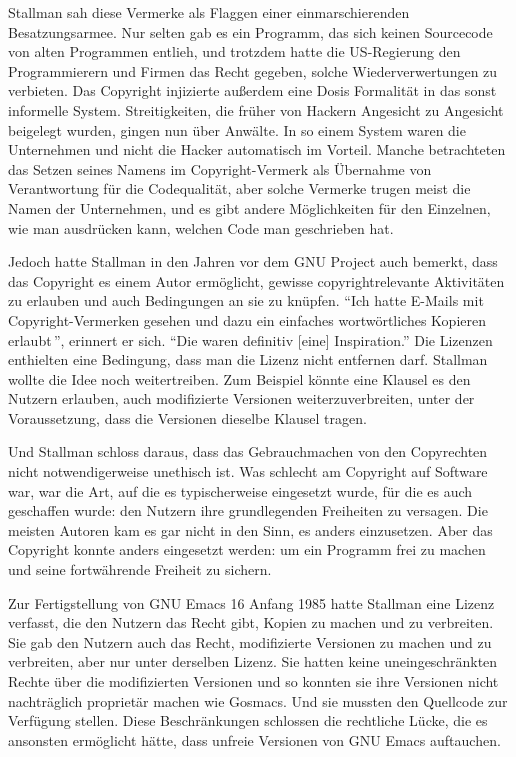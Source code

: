 Stallman sah diese Vermerke als Flaggen einer einmarschierenden Besatzungsarmee. Nur selten gab es ein Programm, das sich keinen Sourcecode von alten Programmen entlieh, und trotzdem hatte die US-Regierung den Programmierern und Firmen das Recht gegeben, solche Wiederverwertungen zu verbieten. Das Copyright injizierte außerdem eine Dosis Formalität in das sonst informelle System. Streitigkeiten, die früher von Hackern Angesicht zu Angesicht beigelegt wurden, gingen nun über Anwälte. In so einem System waren die Unternehmen und nicht die Hacker automatisch im Vorteil. Manche betrachteten das Setzen seines Namens im Copyright-Vermerk als Übernahme von Verantwortung für die Codequalität, aber solche Vermerke trugen meist die Namen der Unternehmen, und es gibt andere Möglichkeiten für den Einzelnen, wie man ausdrücken kann, welchen Code man geschrieben hat.

Jedoch hatte Stallman in den Jahren vor dem GNU Project auch bemerkt, dass das Copyright es einem Autor ermöglicht, gewisse copyrightrelevante Aktivitäten zu erlauben und auch Bedingungen an sie zu knüpfen. "`Ich hatte E-Mails mit Copyright-Vermerken gesehen und dazu ein einfaches \glq wortwörtliches Kopieren erlaubt\grq\,"', erinnert er sich. "`Die waren definitiv [eine] Inspiration."' Die Lizenzen enthielten eine Bedingung, dass man die Lizenz nicht entfernen darf. Stallman wollte die Idee noch weitertreiben. Zum Beispiel könnte eine Klausel es den Nutzern erlauben, auch modifizierte Versionen weiterzuverbreiten, unter der Voraussetzung, dass die Versionen dieselbe Klausel tragen.

Und Stallman schloss daraus, dass das Gebrauchmachen von den Copyrechten nicht notwendigerweise unethisch ist. Was schlecht am Copyright auf Software war, war die Art, auf die es typischerweise eingesetzt wurde, für die es auch geschaffen wurde: den Nutzern ihre grundlegenden Freiheiten zu versagen. Die meisten Autoren kam es gar nicht in den Sinn, es anders einzusetzen. Aber das Copyright konnte anders eingesetzt werden: um ein Programm frei zu machen und seine fortwährende Freiheit zu sichern.

Zur Fertigstellung von GNU Emacs 16 Anfang 1985 hatte Stallman eine Lizenz verfasst, die den Nutzern das Recht gibt, Kopien zu machen und zu verbreiten. Sie gab den Nutzern auch das Recht, modifizierte Versionen zu machen und zu verbreiten, aber nur unter derselben Lizenz. Sie hatten keine uneingeschränkten Rechte über die modifizierten Versionen und so konnten sie ihre Versionen nicht nachträglich proprietär machen wie Gosmacs. Und sie mussten den Quellcode zur Verfügung stellen. Diese Beschränkungen schlossen die rechtliche Lücke, die es ansonsten ermöglicht hätte, dass unfreie Versionen von GNU Emacs auftauchen.

